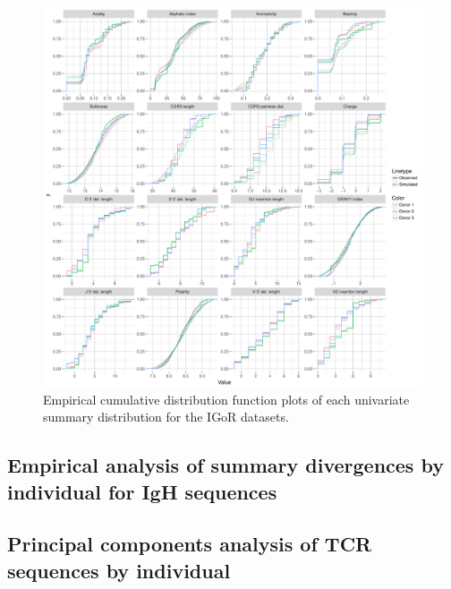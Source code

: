 \documentclass{article}
\begin{document}
\begin{figure}
    \includegraphics[width=\linewidth]{Figures/IgorScores/igor_ecdf.pdf}
    \caption{Empirical cumulative distribution function plots of each univariate summary distribution for the IGoR datasets.}
    \label{fig:IgorECDFs}
\end{figure}

\subsection*{Empirical analysis of summary divergences by individual for IgH sequences}

\subsection*{Principal components analysis of TCR sequences by individual}
\end{document}
